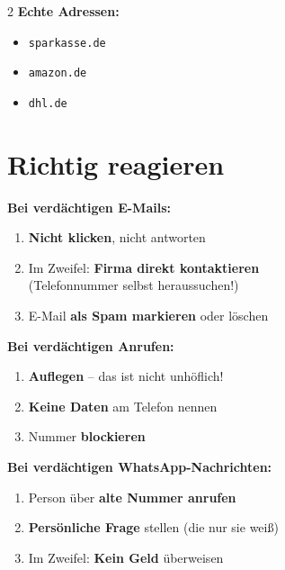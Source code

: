 \documentclass[a4paper,landscape,8pt]{extarticle}
\begin{document}
\begin{multicols}{2}
\textbf{Echte Adressen:}
\begin{itemize}
\item \texttt{sparkasse.de}
\item \texttt{amazon.de}
\item \texttt{dhl.de}
\end{itemize}

\vspace{2mm}

\begin{center}
\end{center}

\columnbreak

\section*{\textcolor{safegreen}{Richtig reagieren}}

\textbf{Bei verdächtigen E-Mails:}
\begin{enumerate}
\item \textbf{Nicht klicken}, nicht antworten
\item Im Zweifel: \textbf{Firma direkt kontaktieren}\\
      (Telefonnummer selbst heraussuchen!)
\item E-Mail \textbf{als Spam markieren} oder löschen
\end{enumerate}

\textbf{Bei verdächtigen Anrufen:}
\begin{enumerate}
\item \textbf{Auflegen} -- das ist nicht unhöflich!
\item \textbf{Keine Daten} am Telefon nennen
\item Nummer \textbf{blockieren}
\end{enumerate}

\textbf{Bei verdächtigen WhatsApp-Nachrichten:}
\begin{enumerate}
\item Person über \textbf{alte Nummer anrufen}
\item \textbf{Persönliche Frage} stellen (die nur sie weiß)
\item Im Zweifel: \textbf{Kein Geld} überweisen
\end{enumerate}


\end{multicols}
\end{document}
